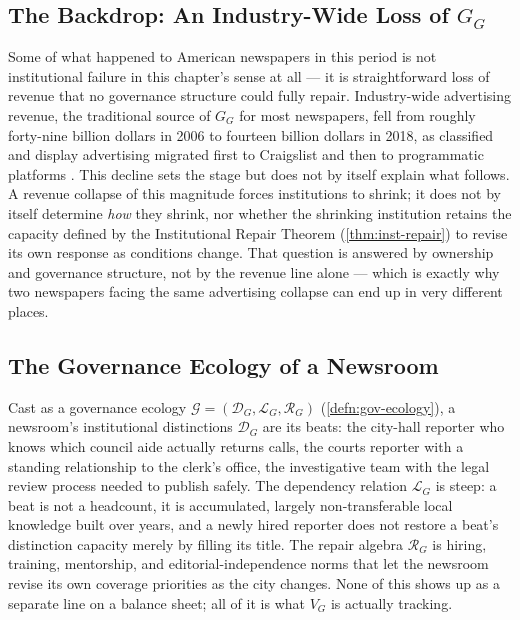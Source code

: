 \documentclass[12pt,twoside,openright]{book}
\begin{document}
\subsection{The Backdrop: An Industry-Wide Loss of \texorpdfstring{$G_G$}{GG}}

Some of what happened to American newspapers in this period is
not institutional failure in this chapter's sense at all --- it
is straightforward loss of revenue that no governance structure
could fully repair. Industry-wide advertising revenue, the
traditional source of $G_G$ for most newspapers, fell from
roughly forty-nine billion dollars in 2006 to fourteen billion
dollars in 2018, as classified and display advertising migrated
first to Craigslist and then to programmatic platforms
\parencite{pew2019newspapers}. This decline sets the stage but
does not by itself explain what follows. A revenue collapse of
this magnitude forces institutions to shrink; it does not by
itself determine \emph{how} they shrink, nor whether the
shrinking institution retains the capacity defined by the
Institutional Repair Theorem (\cref{thm:inst-repair}) to revise
its own response as conditions change. That question is
answered by ownership and governance structure, not by the
revenue line alone --- which is exactly why two newspapers
facing the same advertising collapse can end up in very
different places.

\subsection{The Governance Ecology of a Newsroom}

Cast as a governance ecology $\mathcal{G} = (\mathcal{D}_G,
\mathcal{L}_G, \mathcal{R}_G)$ (\cref{defn:gov-ecology}), a
newsroom's institutional distinctions $\mathcal{D}_G$ are its
beats: the city-hall reporter who knows which council aide
actually returns calls, the courts reporter with a standing
relationship to the clerk's office, the investigative team with
the legal review process needed to publish safely. The
dependency relation $\mathcal{L}_G$ is steep: a beat is not a
headcount, it is accumulated, largely non-transferable local
knowledge built over years, and a newly hired reporter does not
restore a beat's distinction capacity merely by filling its
title. The repair algebra $\mathcal{R}_G$ is hiring, training,
mentorship, and editorial-independence norms that let the
newsroom revise its own coverage priorities as the city changes.
None of this shows up as a separate line on a balance sheet; all
of it is what $V_G$ is actually tracking.
\end{document}

